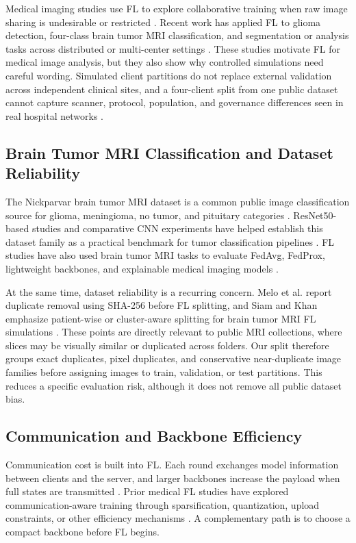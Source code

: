 \documentclass[conference]{IEEEtran}
\begin{document}
Medical imaging studies use FL to explore collaborative training when raw image sharing is undesirable or restricted \cite{rieke2020future}. Recent work has applied FL to glioma detection, four-class brain tumor MRI classification, and segmentation or analysis tasks across distributed or multi-center settings \cite{sharma2025privacy,mastoi2025explainable,saraswat2026hybrid,wakili2025twinsegnet}. These studies motivate FL for medical image analysis, but they also show why controlled simulations need careful wording. Simulated client partitions do not replace external validation across independent clinical sites, and a four-client split from one public dataset cannot capture scanner, protocol, population, and governance differences seen in real hospital networks \cite{naseer2026medfl,xu2023federated}.

\subsection{Brain Tumor MRI Classification and Dataset Reliability}
The Nickparvar brain tumor MRI dataset is a common public image classification source for glioma, meningioma, no tumor, and pituitary categories \cite{nickparvar_brain_tumor_mri}. ResNet50-based studies and comparative CNN experiments have helped establish this dataset family as a practical benchmark for tumor classification pipelines \cite{he2016resnet,bentemessek2025brain,khatoon2026resnet50}. FL studies have also used brain tumor MRI tasks to evaluate FedAvg, FedProx, lightweight backbones, and explainable medical imaging models \cite{ghanta2025federated,sharma2025privacy,mastoi2025explainable}.

At the same time, dataset reliability is a recurring concern. Melo et al. report duplicate removal using SHA-256 before FL splitting, and Siam and Khan emphasize patient-wise or cluster-aware splitting for brain tumor MRI FL simulations \cite{melo2026exploiting,siam2026brain}. These points are directly relevant to public MRI collections, where slices may be visually similar or duplicated across folders. Our split therefore groups exact duplicates, pixel duplicates, and conservative near-duplicate image families before assigning images to train, validation, or test partitions. This reduces a specific evaluation risk, although it does not remove all public dataset bias.

\subsection{Communication and Backbone Efficiency}
Communication cost is built into FL. Each round exchanges model information between clients and the server, and larger backbones increase the payload when full states are transmitted \cite{mcmahan2017fedavg}. Prior medical FL studies have explored communication-aware training through sparsification, quantization, upload constraints, or other efficiency mechanisms \cite{radhika2026communication,aniket2025cfl,zhou2022communication,das2026federated}. A complementary path is to choose a compact backbone before FL begins.
\end{document}
